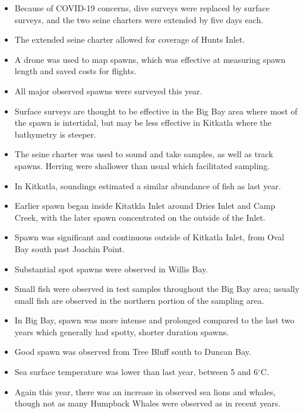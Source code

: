 \begin{itemize}

\item Because of COVID-19 concerns, dive surveys were replaced by surface surveys, and the two seine charters were extended by five days each.

\item The extended seine charter allowed for coverage of Hunts Inlet.

\item A drone was used to map spawns, which was effective at measuring spawn length and saved costs for flights.

\item All major observed spawns were surveyed this year.

\item Surface surveys are thought to be effective in the Big Bay area where most of the spawn is intertidal,
but may be less effective in Kitkatla where the bathymetry is steeper.

\item The seine charter was used to sound and take samples, as well as track spawns.
Herring were shallower than usual which facilitated sampling.

\item In Kitkatla, soundings estimated a similar abundance of fish as last year.

\item Earlier spawn began inside Kitatkla Inlet around Dries Inlet and Camp Creek,
with the later spawn concentrated on the outside of the Inlet.

\item Spawn was significant and continuous outside of Kitkatla Inlet, from Oval Bay south past Joachin Point.

\item Substantial spot spawns were observed in Willis Bay.

\item Small fish were observed in test samples throughout the Big Bay area;
usually small fish are observed in the northern portion of the sampling area.

\item In Big Bay, spawn was more intense and prolonged compared to the last two years which generally had spotty, shorter duration spawns.

\item Good spawn was observed from Tree Bluff south to Duncan Bay.

\item Sea surface temperature was lower than last year, between 5 and 6$^\circ\text{C}$.

\item Again this year, there was an increase in observed sea lions and whales,
though not as many Humpback Whales were observed as in recent years.

\end{itemize}
